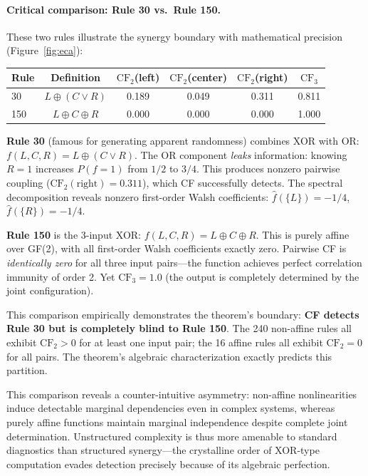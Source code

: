 \documentclass[10pt]{article} %
\theoremstyle{plain}
\theoremstyle{definition}
\begin{document}
\paragraph{Critical comparison: Rule 30 vs.\ Rule 150.} These two rules illustrate the synergy boundary with mathematical precision (Figure~\ref{fig:eca}):

\begin{center}
\begin{tabular}{lccccc}
\toprule
\textbf{Rule} & \textbf{Definition} & \textbf{$\text{CF}_2$(left)} & \textbf{$\text{CF}_2$(center)} & \textbf{$\text{CF}_2$(right)} & \textbf{$\text{CF}_3$} \\
\midrule
30 & $L \oplus (C \lor R)$ & 0.189 & 0.049 & 0.311 & 0.811 \\
150 & $L \oplus C \oplus R$ & 0.000 & 0.000 & 0.000 & 1.000 \\
\bottomrule
\end{tabular}
\end{center}

\noindent \textbf{Rule 30} (famous for generating apparent randomness) combines XOR with OR: $f(L, C, R) = L \oplus (C \lor R)$. The OR component \emph{leaks} information: knowing $R = 1$ increases $P(f = 1)$ from $1/2$ to $3/4$. This produces nonzero pairwise coupling ($\text{CF}_2(\text{right}) = 0.311$), which CF successfully detects. The spectral decomposition reveals nonzero first-order Walsh coefficients: $\hat{f}(\{L\}) = -1/4$, $\hat{f}(\{R\}) = -1/4$.

\noindent \textbf{Rule 150} is the 3-input XOR: $f(L, C, R) = L \oplus C \oplus R$. This is purely affine over GF(2), with all first-order Walsh coefficients exactly zero. Pairwise CF is \emph{identically zero} for all three input pairs---the function achieves perfect correlation immunity of order 2. Yet $\text{CF}_3 = 1.0$ (the output is completely determined by the joint configuration).

This comparison empirically demonstrates the theorem's boundary: \textbf{CF detects Rule 30 but is completely blind to Rule 150}. The 240 non-affine rules all exhibit $\text{CF}_2 > 0$ for at least one input pair; the 16 affine rules all exhibit $\text{CF}_2 = 0$ for all pairs. The theorem's algebraic characterization exactly predicts this partition.

This comparison reveals a counter-intuitive asymmetry: non-affine nonlinearities induce detectable marginal dependencies even in complex systems, whereas purely affine functions maintain marginal independence despite complete joint determination. Unstructured complexity is thus more amenable to standard diagnostics than structured synergy---the crystalline order of XOR-type computation evades detection precisely because of its algebraic perfection.
\end{document}
